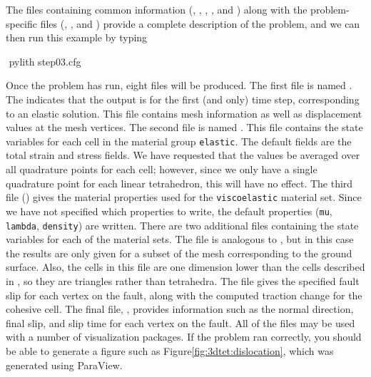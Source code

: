 The files containing common information
(,
, ,
, and
) along with the
problem-specific files (,
, and )
provide a complete description of the problem, and we can then run
this example by typing
\begin{shell}
$$ pylith step03.cfg
\end{shell}
Once the problem has run, eight files will be produced. The first file
is named . The 
indicates that the output is for the first (and only) time step,
corresponding to an elastic solution. This file contains mesh
information as well as displacement values at the mesh vertices. The
second file is named
. This file contains
the state variables for each cell in the material group
\texttt{elastic}.  The default fields are the total strain and stress
fields. We have requested that the values be averaged over all
quadrature points for each cell; however, since we only have a single
quadrature point for each linear tetrahedron, this will have no
effect. The third file
() gives the
material properties used for the \texttt{viscoelastic} material
set. Since we have not specified which properties to write, the
default properties (\texttt{mu}, \texttt{lambda}, \texttt{density})
are written. There are two additional files containing the state
variables for each of the material sets. The file
 is analogous to
, but in this case the results are only
given for a subset of the mesh corresponding to the ground
surface. Also, the cells in this file are one dimension lower than the
cells described in , so they are
triangles rather than tetrahedra. The file
 gives the specified fault slip
for each vertex on the fault, along with the computed traction change
for the cohesive cell. The final file,
, provides information such as the
normal direction, final slip, and slip time for each vertex on the
fault. All of the  files may be used with a number of
visualization packages. If the problem ran correctly, you should be
able to generate a figure such as Figure\vref{fig:3dtet:dislocation},
which was generated using ParaView.

